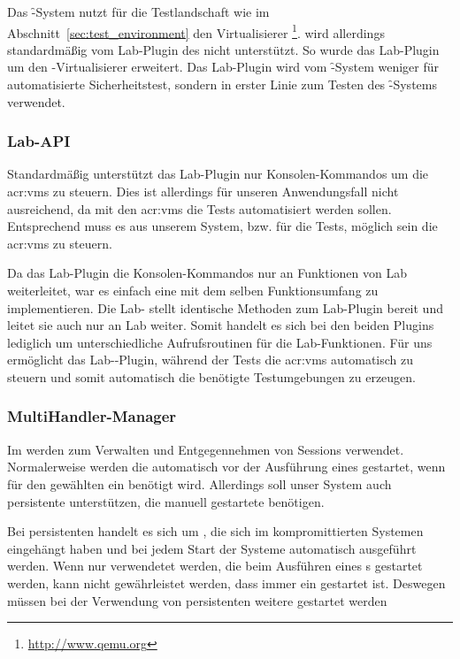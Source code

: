 Das \f-System nutzt für die Testlandschaft wie im
Abschnitt~\ref{sec:test_environment} den Virtualisierer
\footnote{\url{http://www.qemu.org}}.  wird allerdings
standardmäßig vom Lab-Plugin des  nicht unterstützt. So wurde das
Lab-Plugin um den -Virtualisierer erweitert. Das Lab-Plugin wird
vom \f-System weniger für automatisierte Sicherheitstest, sondern
in erster Linie zum Testen des \f-Systems verwendet.

\subsubsection{Lab-API}
\label{lab-api}
\authors{\LM}{\HM \and \DE \and \MW}

Standardmäßig unterstützt das Lab-Plugin nur Konsolen-Kommandos um die
\glspl{acr:vm} zu steuern. Dies ist allerdings für unseren Anwendungsfall nicht
ausreichend, da mit den \glspl{acr:vm} die Tests automatisiert werden sollen.
Entsprechend muss es aus unserem System, bzw. für die Tests, möglich sein die
\glspl{acr:vm} zu steuern.

Da das Lab-Plugin die Konsolen-Kommandos nur an Funktionen von Lab
weiterleitet, war es einfach eine  mit dem selben Funktionsumfang zu
implementieren. Die Lab- stellt identische Methoden zum Lab-Plugin bereit und
leitet sie auch nur an Lab weiter. Somit handelt es sich bei den beiden Plugins
lediglich um unterschiedliche Aufrufsroutinen für die Lab-Funktionen. Für uns
ermöglicht das Lab--Plugin, während der Tests die \glspl{acr:vm} automatisch
zu steuern und somit automatisch die benötigte Testumgebungen zu erzeugen.

\subsubsection{MultiHandler-Manager}
\label{multihandler-manager}
\authors{\LM}{\HM \and \DE \and \MW}
Im  werden  zum Verwalten und
Entgegennehmen von Sessions verwendet. Normalerweise werden
die  automatisch vor der Ausführung eines  gestartet,
wenn für den gewählten  ein
 benötigt wird. Allerdings soll unser System auch persistente
 unterstützen, die manuell gestartete  benötigen.

Bei persistenten  handelt es sich um , die
sich im kompromittierten Systemen eingehängt haben und bei jedem Start der
Systeme automatisch ausgeführt werden. Wenn nur 
verwendetet werden, die beim Ausführen eines s gestartet
werden, kann nicht gewährleistet werden, dass immer ein 
gestartet ist. Deswegen müssen bei der Verwendung von persistenten
 weitere  gestartet werden

